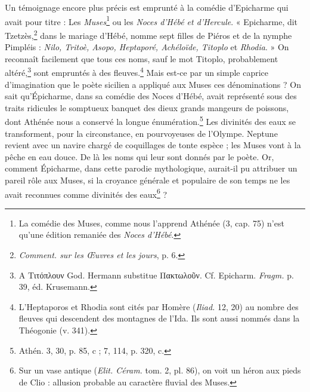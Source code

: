 \documentclass[a4paper, 11pt, oneside, polutonikogreek, french]{article}
\begin{document}
Un témoignage encore plus précis est emprunté à la comédie d'Epicharme qui avait pour titre : Les \emph{Muses}\footnote{La comédie des Muses, comme nous l'apprend Athénée (3, cap. 75) n'est qu'une édition remaniée des \emph{Noces d'Hébé}.} ou les \emph{Noces d'Hébé et d'Hercule}. « Epicharme, dit Tzetzès,\footnote{\emph{Comment. sur les Œuvres et les jours}, p. 6.} dans le mariage d'Hébé, nomme sept filles de Piéros et de la nymphe Pimpléis : \emph{Nilo, Tritoè, Asopo, Heptaporé, Achéloïde, Titoplo} et \emph{Rhodia}. » On reconnaît facilement que tous ces noms, sauf le mot Titoplo, probablement altéré,\footnote{A Τιτόπλουν God. Hermann substitue Πακτωλοῦν. Cf. Epicharm. \emph{Fragm.} p. 39, éd. Krusemann.} sont empruntés à des fleuves.\footnote{L'Heptaporos et Rhodia sont cités par Homère (\emph{Iliad.} 12, 20) au nombre des fleuves qui descendent des montagnes de l'Ida. Ils sont aussi nommés dans la Théogonie (v. 341).} Mais est-ce par un simple caprice d'imagination que le poète sicilien a appliqué aux Muses ces dénominations ? On sait qu'Épicharme, dans sa comédie des Noces d'Hébé, avait représenté sous des traits ridicules le somptueux banquet des dieux grands mangeurs de poissons, dont Athénée nous a conservé la longue énumération.\footnote{Athén. 3, 30, p. 85, c ; 7, 114, p. 320, c.} Les divinités des eaux se transforment, pour la circonstance, en pourvoyeuses de l'Olympe. Neptune revient avec un navire chargé de coquillages de tonte espèce ; les Muses vont à la pêche en eau douce. De là les noms qui leur sont donnés par le poète. Or, comment Épicharme, dans cette parodie mythologique, aurait-il pu attribuer un pareil rôle aux Muses, si la croyance générale et populaire de son temps ne les avait reconnues comme divinités des eaux\footnote{Sur un vase antique (\emph{Elit. Céram.} tom. 2, pl. 86), on voit un héron aux pieds de Clio : allusion probable au caractère fluvial des Muses.} ?
\end{document}
